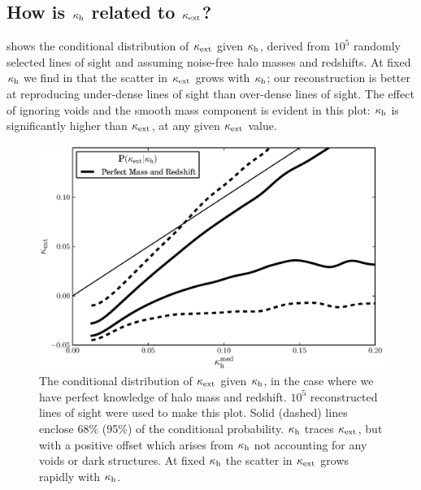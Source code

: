 \documentclass[useAMS,usenatbib,a4paper]{mn2e}
\begin{document}

\subsection{How is $\kappa_{\rm h}$ related to $\kappa_{\rm ext}$?}

 shows the conditional distribution of $\kappa_{\rm ext}$ given 
$\kappa_{\rm h}$, derived from $10^5$ randomly selected \MS lines of sight
and assuming noise-free halo masses and redshifts. 
At fixed $\kappa_{\rm h}$ we find in  that the scatter in 
$\kappa_{\rm ext}$
grows with $\kappa_{\rm h}$; our reconstruction is better at reproducing under-dense
lines of sight than over-dense lines of sight. The effect of ignoring voids
and the smooth mass component is evident in this plot: $\kappa_{\rm h}$ is
significantly higher than $\kappa_{\rm ext}$, at any given $\kappa_{\rm ext}$ value. 

\begin{figure}
\includegraphics[width=\columnwidth]{figs/cornerplot.eps}
\caption[Biased?]{The conditional distribution of 
$\kappa_{\rm ext}$ given $\kappa_{\rm h}$, in the case where  
we have perfect knowledge of halo mass and redshift.
$10^5$ reconstructed lines of
sight were used to make this plot. 
Solid (dashed) lines enclose 68\% (95\%) of the conditional probability.
$\kappa_{\rm h}$ traces $\kappa_{\rm ext}$, but with a positive offset which arises from
$\kappa_{\rm h}$ not accounting for any voids or dark structures.
At fixed $\kappa_{\rm h}$ the scatter in $\kappa_{\rm ext}$ grows rapidly with $\kappa_{\rm h}$.
}
\label{fig:jointkh-k}
\end{figure}
\end{document}
